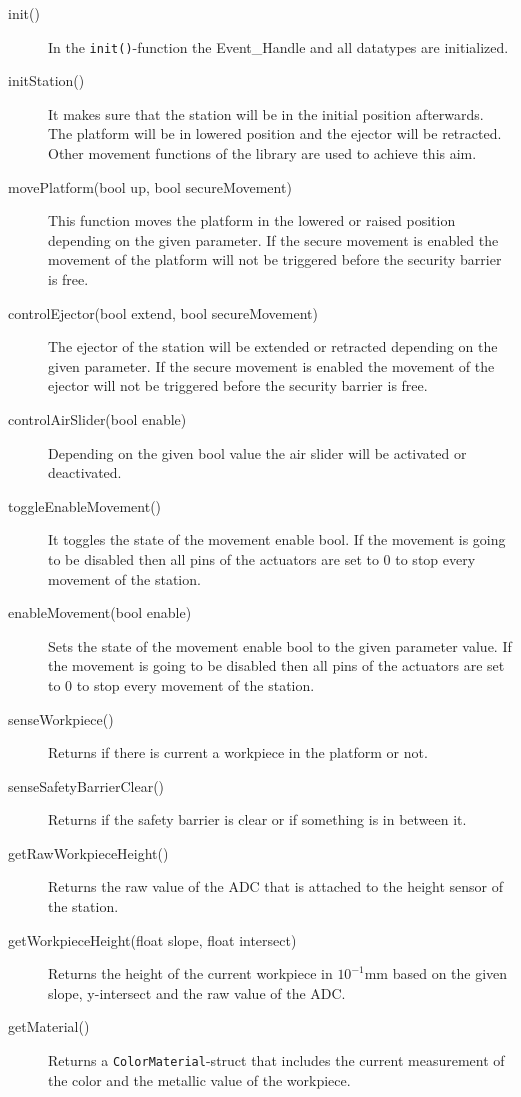 \begin{description} 
	\item[init()] In the \texttt{init()}-function the Event\_Handle and all datatypes are initialized. 
	\item[initStation()] It makes sure that the station will be in the initial position afterwards. The platform will be in lowered position and the ejector will be retracted. Other movement functions of the library are used to achieve this aim.
	\item[movePlatform(bool up, bool secureMovement)] This function moves the platform in the lowered or raised position depending on the given parameter. If the secure movement is enabled the movement of the platform will not be triggered before the security barrier is free. 
	\item[controlEjector(bool extend, bool secureMovement)] The ejector of the station will be extended or retracted depending on the given parameter. If the secure movement is enabled the movement of the ejector will not be triggered before the security barrier is free. 
	\item[controlAirSlider(bool enable)] Depending on the given bool value the air slider will be activated or deactivated.
	\item[toggleEnableMovement()] It toggles the state of the movement enable bool. If the movement is going to be disabled then all pins of the actuators are set to 0 to stop every movement of the station.
	\item[enableMovement(bool enable)] Sets the state of the movement enable bool to the given parameter value. If the movement is going to be disabled then all pins of the actuators are set to 0 to stop every movement of the station.
	\item[senseWorkpiece()] Returns if there is current a workpiece in the platform or not.
	\item[senseSafetyBarrierClear()] Returns if the safety barrier is clear or if something is in between it.
	\item[getRawWorkpieceHeight()] Returns the raw value of the ADC that is attached to the height sensor of the station. 
	\item[getWorkpieceHeight(float slope, float intersect)] Returns the height of the current workpiece in $10^{-1}$mm based on the given slope, y-intersect and the raw value of the ADC.
	\item[getMaterial()] Returns a \texttt{ColorMaterial}-struct that includes the current measurement of the color and the metallic value of the workpiece.
\end{description}

